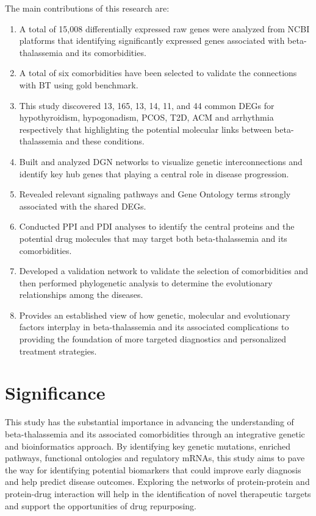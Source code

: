 The main contributions of this research are:


\begin{enumerate}[label=\arabic*)]
\item A total of 15,008 differentially expressed raw genes were analyzed from NCBI platforms that identifying significantly expressed genes associated with beta-thalassemia and its comorbidities.
\item A total of six comorbidities have been selected to validate the connections with BT using gold benchmark.
\item This study discovered 13, 165, 13, 14, 11, and 44 common DEGs for hypothyroidism, hypogonadism, PCOS, T2D, ACM and arrhythmia respectively that highlighting the potential molecular links between beta-thalassemia and these conditions.
\item Built and analyzed DGN networks to visualize genetic interconnections and identify key hub genes that playing a central role in disease progression.
\item Revealed relevant signaling pathways and Gene Ontology terms strongly associated with the shared DEGs.
\item Conducted PPI and PDI analyses to identify the central proteins and the potential drug molecules that may target both beta-thalassemia and its comorbidities.
\item Developed a validation network to validate the selection of comorbidities and then performed phylogenetic analysis to determine the evolutionary relationships among the diseases.
\item Provides an established view of how genetic, molecular and evolutionary factors interplay in beta-thalassemia and its associated complications to providing the foundation of more targeted diagnostics and personalized treatment strategies.
\end{enumerate}

\section{Significance}
\label{sec:sec03}

This study has the substantial importance in advancing the understanding of beta-thalassemia and its associated comorbidities through an integrative genetic and bioinformatics approach. By identifying key genetic mutations, enriched pathways, functional ontologies and regulatory mRNAs, this study aims to pave the way for identifying potential biomarkers that could improve early diagnosis and help predict disease outcomes. Exploring the networks of protein-protein and protein-drug interaction will help in the identification of novel therapeutic targets and support the opportunities of drug repurposing.

